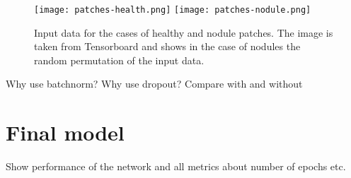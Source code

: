 \documentclass[main.tex]{subfiles}
\begin{document}
\begin{figure}
\begin{center}
\texttt{[image: patches-health.png]}
\texttt{[image: patches-nodule.png]}
\end{center}
\caption{Input data for the cases of healthy and nodule patches. The image is taken from Tensorboard and shows in the case of nodules the random permutation of the input data.}
\label{fig:input}
\end{figure}

Why use batchnorm?
Why use dropout?
Compare with and without

\section{Final model}
Show performance of the network and all metrics about number of epochs etc.
\end{document}
